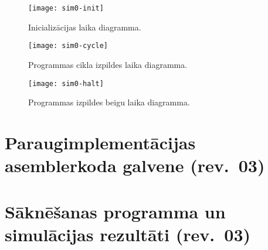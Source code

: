 

\begin{sidewaysfigure}
	\centering
	\texttt{[image: sim0-init]}\\
	\caption{Inicializācijas laika diagramma.}
	\label{fig:sim-init}
\end{sidewaysfigure}

\begin{sidewaysfigure}
	\centering
	\texttt{[image: sim0-cycle]}\\
	\caption{Programmas cikla izpildes laika diagramma.}
	\label{fig:sim-cycle}
\end{sidewaysfigure}

\begin{sidewaysfigure}
	\centering
	\texttt{[image: sim0-halt]}\\
	\caption{Programmas izpildes beigu laika diagramma.}
	\label{fig:sim-halt}
\end{sidewaysfigure}



\clearpage
\section{Paraugimplementācijas asemblerkoda galvene (rev.~03)}


\clearpage
\section{Sāknēšanas programma un simulācijas rezultāti (rev.~03)} \label{appx:boot}


